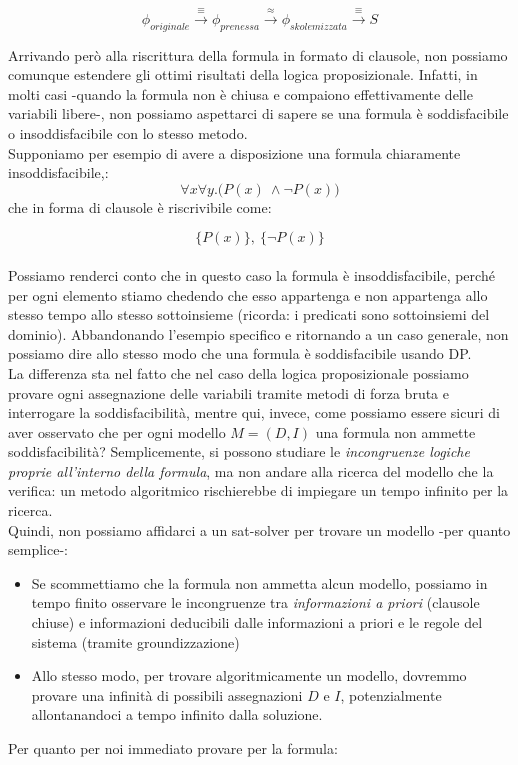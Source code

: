 \documentclass[a4paper,10pt]{article}
\begin{document}
$$\phi_{originale}\overset{\equiv}{\longrightarrow}\phi_{prenessa}\overset{\approx}{\longrightarrow}\phi_{skolemizzata}\overset{\equiv}{\longrightarrow}S$$

Arrivando però alla riscrittura della formula in formato di clausole, non possiamo comunque estendere gli ottimi risultati della logica proposizionale. Infatti, in molti casi -quando la formula non è chiusa e compaiono effettivamente delle variabili libere-, non possiamo aspettarci di sapere se una formula è soddisfacibile o insoddisfacibile con lo stesso metodo. \\
Supponiamo per esempio di avere a disposizione una formula chiaramente insoddisfacibile,: 
$$\forall x\forall y. \bigg(P(x)\ \land \lnot P(x)\bigg)$$
che in forma di clausole è riscrivibile come:

$$\{P(x)\},\ \{\lnot P(x)\}$$\\
Possiamo renderci conto che in questo caso la formula è insoddisfacibile, perché per ogni elemento stiamo chedendo che esso appartenga e non appartenga allo stesso tempo allo stesso sottoinsieme (ricorda: i predicati sono sottoinsiemi del dominio). Abbandonando l'esempio specifico e ritornando a un caso generale, non possiamo dire allo stesso modo che una formula è soddisfacibile usando DP.\\

La differenza sta nel fatto che nel caso della logica proposizionale possiamo provare ogni assegnazione delle variabili tramite metodi di forza bruta e interrogare la soddisfacibilità, mentre qui, invece, come possiamo essere sicuri di aver osservato che per ogni modello $M=(D,I)$ una formula non ammette soddisfacibilità? Semplicemente, si possono studiare le \textit{incongruenze logiche proprie all'interno della formula}, ma non  andare alla ricerca del modello che la verifica: un metodo algoritmico rischierebbe di impiegare un tempo infinito per la ricerca. \\

Quindi, non possiamo affidarci a un sat-solver per trovare un modello -per quanto semplice-:
\begin{itemize}
    \item Se scommettiamo che la formula non ammetta alcun modello, possiamo in tempo finito osservare le incongruenze tra \textit{informazioni a priori} (clausole chiuse) e informazioni deducibili dalle informazioni a priori e le regole del sistema (tramite groundizzazione)
    \item Allo stesso modo, per trovare algoritmicamente un modello, dovremmo provare una infinità di possibili assegnazioni $D$ e $I$, potenzialmente allontanandoci a tempo infinito dalla soluzione. 
\end{itemize}
Per quanto per noi immediato provare per la formula:
\end{document}
